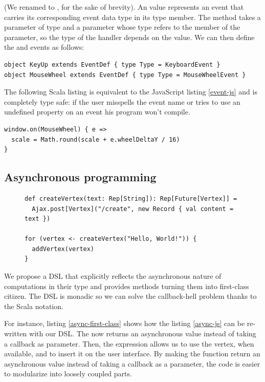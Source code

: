 \documentclass[american,english,runningheads]{llncs}
\begin{document}
(We renamed  to , for the sake of brevity). An  value represents an
event that carries its corresponding event data type in its  type member. The  method takes a
parameter  of type  and a  parameter whose type refers to the 
member of the  parameter, so the type of the handler depends on the  value. We can then define the
 and  events as follows:

\begin{lstlisting}
object KeyUp extends EventDef { type Type = KeyboardEvent }
object MouseWheel extends EventDef { type Type = MouseWheelEvent }
\end{lstlisting}

The following Scala listing is equivalent to the JavaScript listing \ref{event-js} and is completely type safe: if
the user misspells the event name or tries to use an undefined property on an event his program won’t compile.

\begin{lstlisting}
window.on(MouseWheel) { e =>
  scale = Math.round(scale + e.wheelDeltaY / 16)
}
\end{lstlisting}

\subsection{Asynchronous programming}

\begin{figure}
\centering
\begin{lstlisting}[caption=Asynchronous values are first class citizen,label=async-first-class]
def createVertex(text: Rep[String]): Rep[Future[Vertex]] =
  Ajax.post[Vertex]("/create", new Record { val content = text })

for (vertex <- createVertex("Hello, World!")) {
  addVertex(vertex)
}
\end{lstlisting}
\end{figure}

We propose a DSL that explicitly reflects the asynchronous nature of computations in their type and provides methods
turning them into first-class citizen. The DSL is monadic so we can solve the callback-hell problem thanks to the
Scala  notation.

For instance, listing \ref{async-first-class} shows how the listing \ref{async-js} can be
re-written with our DSL. The  now returns an asynchronous value instead of taking a callback as
parameter. Then, the  expression allows us to use the vertex, when available, and to insert it on the user
interface. By making the  function return an asynchronous value instead of taking a callback as
a parameter, the code is easier to modularize into loosely coupled parts.
\end{document}
